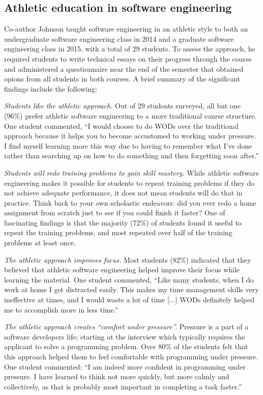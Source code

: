 \subsection{Athletic education in software engineering}

Co-author Johnson taught software engineering in an athletic style to both an undergraduate software engineering class in 2014 and a graduate software engineering class in 2015, with a total of 29 students. To assess the approach, he required students to write technical essays on their progress through the course and administered a questionnaire near the end of the semester that obtained opions from all students in both courses. A brief summary of the significant findings include the following:

{\em Students like the athletic approach.} Out of 29 students surveyed, all but one (96\%) prefer athletic software engineering to a more traditional course structure.  One student commented, ``I would choose to do WODs over the traditional approach because it helps you to become accustomed to working under pressure. I find myself learning more this way due to having to remember what I’ve done rather than searching up on how to do something and then forgetting soon after.''

{\em Students will redo training problems to gain skill mastery.}  While athletic software engineering makes it possible for students to repeat training problems if they do not achieve adequate performance, it does not mean students will do that in practice. Think back to your own scholastic endeavors: did you ever redo a home assignment from scratch just to see if you could finish it faster? One of fascinating findings is that the majority (72\%) of students found it useful to repeat the training problems, and most repeated over half of the training problems at least once. 

{\em The athletic approach improves focus.}  Most students (82\%) indicated that they believed that athletic software engineering helped improve their focus while learning the material.  One student commented, ``Like many students, when I do work at home I get distracted easily. This makes my time management skills very ineffective at times, and I would waste a lot of time [...] WODs definitely helped me to accomplish more in less time.''

{\em The athletic approach creates ``comfort under pressure''.}  Pressure is a part of a software developers life; starting at the interview which typically requires the applicant to solve a programming problem.  Over 80\% of the students felt that this approach helped them to feel comfortable with programming under pressure.  One student commented: ``I am indeed more confident in programming under pressure. I have learned to think not more quickly, but more calmly and collectively, as that is probably most important in completing a task faster.''

